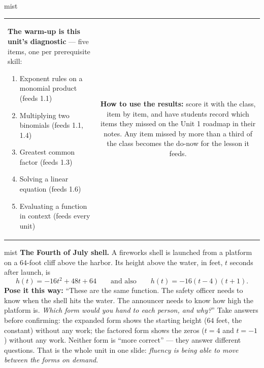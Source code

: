 \documentclass[10pt]{article}
\begin{document}
\begin{fixedskillbox}{mist}
\begin{tabularx}{\linewidth}{@{}X c@{}}
\begin{minipage}[t]{0.55\linewidth}\vspace{0pt}
\textbf{The warm-up is this unit's diagnostic} --- five items, one per prerequisite skill:
\begin{enumerate}[leftmargin=1.4em, itemsep=1pt, topsep=2pt]
  \item Exponent rules on a monomial product (feeds 1.1)
  \item Multiplying two binomials (feeds 1.1, 1.4)
  \item Greatest common factor (feeds 1.3)
  \item Solving a linear equation (feeds 1.6)
  \item Evaluating a function in context (feeds every unit)
\end{enumerate}
\end{minipage}
&
\begin{minipage}[t]{0.38\linewidth}\vspace{0pt}
\textbf{How to use the results:} score it with the class, item by item, and have students
record which items they missed on the Unit 1 roadmap in their notes. Any item missed by more
than a third of the class becomes the do-now for the lesson it feeds.
\end{minipage}
\end{tabularx}
\end{fixedskillbox}

\begin{skillbox}[Hook]{mist}
\textbf{The Fourth of July shell.} A fireworks shell is launched from a platform on a $64$-foot
cliff above the harbor. Its height above the water, in feet, $t$ seconds after launch, is
\[ h(t) = -16t^2 + 48t + 64 \qquad\text{and also}\qquad h(t) = -16(t-4)(t+1). \]
\textbf{Pose it this way:} ``These are the same function. The safety officer needs to know when
the shell hits the water. The announcer needs to know how high the platform is. \emph{Which form
would you hand to each person, and why?}'' Take answers before confirming: the expanded form
shows the starting height ($64$ feet, the constant) without any work; the factored form shows the
zeros ($t=4$ and $t=-1$) without any work. Neither form is ``more correct'' --- they answer
different questions. That is the whole unit in one slide: \emph{fluency is being able to move
between the forms on demand}.
\end{skillbox}
\end{document}
